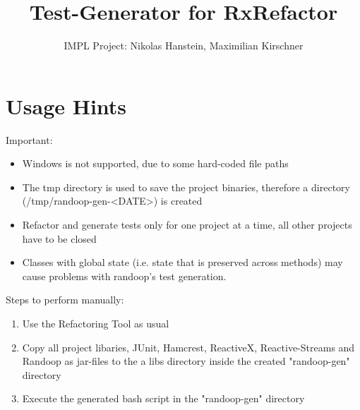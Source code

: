 \documentclass[accentcolor=tud9c, colorback]{tudreport}
\title{Test-Generator for RxRefactor}
\subtitle{IMPL Project: Nikolas Hanstein, Maximilian Kirschner}
\begin{document}
	\maketitle
	\chapter{Usage Hints}
		Important:
		\begin{itemize}
			\item Windows is not supported, due to some hard-coded file paths
			\item The tmp directory is used to save the project binaries, therefore a directory (/tmp/randoop-gen-<DATE>) is created
			\item Refactor and generate tests only for one project at a time, all other projects have to be closed
			\item Classes with global state (i.e. state that is preserved across methods) may cause problems with randoop's test generation.
		\end{itemize}
		Steps to perform manually:
		\begin{enumerate}
			\item Use the Refactoring Tool as usual
			\item Copy all project libaries, JUnit, Hamcrest, ReactiveX, Reactive-Streams and Randoop as jar-files to the a libs directory inside the created "randoop-gen" directory
			\item Execute the generated bash script in the "randoop-gen" directory
		\end{enumerate}
		
\end{document}
